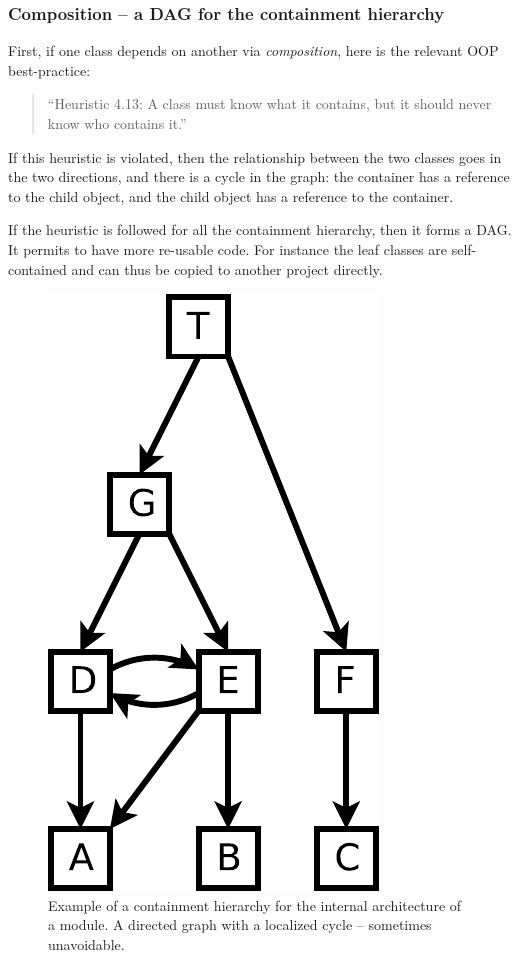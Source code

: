 \documentclass[a4paper,11pt]{article}
\begin{document}
\subsubsection{Composition -- a DAG for the containment hierarchy}
\label{dag-of-classes--composition}

First, if one class depends on another via \emph{composition}, here is the relevant OOP best-practice:
\begin{quotation}
  ``Heuristic 4.13: A class must know what it contains, but it should never know who contains it.''
\end{quotation}

If this heuristic is violated, then the relationship between the two classes goes in the two directions, and there is a cycle in the graph: the container has a reference to the child object, and the child object has a reference to the container.

If the heuristic is followed for all the containment hierarchy, then it forms a DAG. It permits to have more re-usable code. For instance the leaf classes are self-contained and can thus be copied to another project directly.

\begin{figure}[p]
  \begin{center}
    \includegraphics[scale=0.5]{images/graph-with-localized-cycle.pdf}
    \caption{Example of a containment hierarchy for the internal architecture of a module. A directed graph with a localized cycle -- sometimes unavoidable.}
    \label{fig:graph-with-localized-cycle}
  \end{center}
\end{figure}
\end{document}

